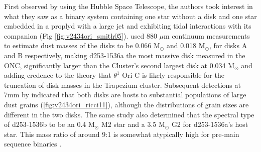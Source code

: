 First observed by \citet{Smith2005} using the Hubble Space Telescope, the authors took interest in what they saw as a binary system containing one star without a disk and one star embedded in a proplyd with a large jet and exhibiting tidal interactions with its companion (Fig \ref{fig:v2434ori_smith05}). \citet{MannWilliams2009} used 880 $\mu$m continuum measurements to estimate dust masses of the disks to be 0.066 M$_{\odot}$ and 0.018 M$_{\odot}$, for disks A and B respectively, making d253-1536a the most massive disk measured in the ONC, significantly larger than the Cluster's second largest disk at 0.034 M$_\odot$ and adding credence to the theory that $\theta^1$ Ori C is likely responsible for the truncation of disk masses in the Trapezium cluster. Subsequent detections at 7mm by \cite{Ricci2011} indicated that both disks are hosts to substantial populations of large dust grains (\ref{fig:v2434ori_ricci11}), although the distributions of grain sizes are different in the two disks. The same study also determined that the spectral type of d253-1536b to be an 0.4 M$_\odot$ M2 star and a 3.5 M$_\odot$ G2 for d253-1536a's host star. This mass ratio of around 9:1 is somewhat atypically high for pre-main sequence binaries \citep{Duchene2013}.


\begin{figure}[htp]
  \hspace*{\fill}%
  \hfill%
  \vfill%
  \hfill%
  \hfill%
  \hspace*{\fill}%
  \label{fig:m1map}
\end{figure}

